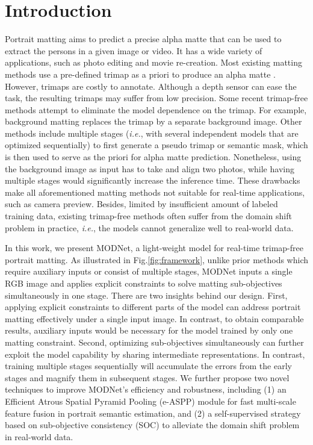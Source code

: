 \documentclass[letterpaper]{article} \usepackage{aaai22}  \usepackage{times}  \usepackage{helvet}  \usepackage{courier}  \usepackage[hyphens]{url}  \usepackage{graphicx} \urlstyle{rm} \def\UrlFont{\rm}  \usepackage{natbib}  \usepackage{caption} \usepackage{booktabs}
\begin{document}
\section{Introduction}
Portrait matting aims to predict a precise alpha matte that can be used to extract the persons in a given image or video. It has a wide variety of applications, such as photo editing and movie re-creation. 
Most existing matting methods use a pre-defined trimap as a priori to produce an alpha matte \cite{AdaMatting, CAMatting, GCA, IndexMatter, SampleMatting, DIM}.
However, trimaps are costly to annotate. Although a depth sensor \cite{ToF} can ease the task, the resulting trimaps may suffer from low precision. Some recent trimap-free methods attempt to eliminate the model dependence on the trimap. For example, background matting \cite{BM} replaces the trimap by a separate background image. Other methods \cite{SHM, BSHM, DAPM} include multiple stages ({\it i.e.}, with several independent models that are optimized sequentially) to first generate a pseudo trimap or semantic mask, which is then used to serve as the priori for alpha matte prediction.
Nonetheless, using the background image as input has to take and align two photos, while having multiple stages would significantly increase the inference time. These drawbacks make all aforementioned matting methods not suitable for real-time applications, such as camera preview. Besides, limited by insufficient amount of labeled training data, existing trimap-free methods often suffer from the domain shift problem \cite{DomainShift} in practice, {\it i.e.}, the models cannot generalize well to real-world data.

In this work, we present MODNet, a light-weight model for real-time trimap-free portrait matting. As illustrated in Fig.\;\ref{fig:framework}, unlike prior methods which require auxiliary inputs or consist of multiple stages, MODNet inputs a single RGB image and applies explicit constraints to solve matting sub-objectives simultaneously in one stage. There are two insights behind our design.
First, applying explicit constraints to different parts of the model can address portrait matting effectively under a single input image. In contrast, to obtain comparable results, auxiliary inputs would be necessary for the model trained by only one matting constraint.
Second, optimizing sub-objectives simultaneously can further exploit the model capability by sharing intermediate representations. In contrast, training multiple stages sequentially will accumulate the errors from the early stages and magnify them in subsequent stages.
We further propose two novel techniques to improve MODNet's efficiency and robustness, including (1) an Efficient Atrous Spatial Pyramid Pooling (e-ASPP) module for fast multi-scale feature fusion in portrait semantic estimation, and (2) a self-supervised strategy based on sub-objective consistency (SOC) to alleviate the domain shift problem in real-world data.
\end{document}
